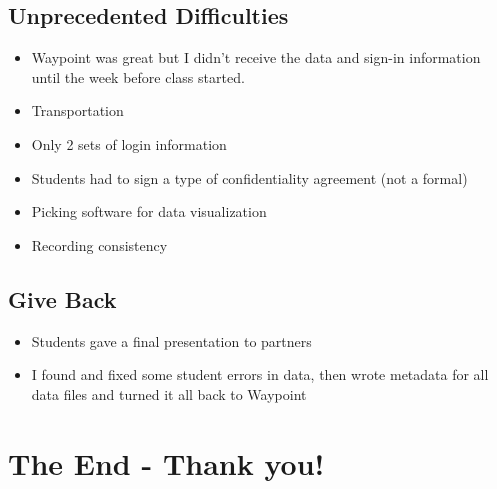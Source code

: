 \documentclass[
  letterpaper,
  DIV=11,
  numbers=noendperiod]{scrartcl}
\providecommand{\tightlist}{%
  \setlength{\itemsep}{0pt}\setlength{\parskip}{0pt}}\usepackage{longtable,booktabs,array}
\begin{document}
\subsection{Unprecedented
Difficulties}\label{unprecedented-difficulties}

\begin{itemize}
\tightlist
\item
  Waypoint was great but I didn't receive the data and sign-in
  information until the week before class started.
\item
  Transportation
\item
  Only 2 sets of login information
\item
  Students had to sign a type of confidentiality agreement (not a
  formal)
\item
  Picking software for data visualization
\item
  Recording consistency
\end{itemize}

\subsection{Give Back}\label{give-back}

\begin{itemize}
\tightlist
\item
  Students gave a final presentation to partners
\item
  I found and fixed some student errors in data, then wrote metadata for
  all data files and turned it all back to Waypoint
\end{itemize}

\section{The End - Thank you!}\label{the-end---thank-you}
\end{document}
